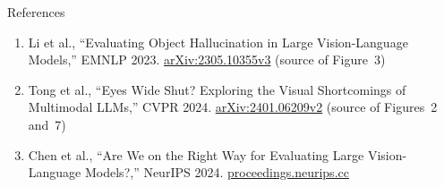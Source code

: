 \begin{frame}[allowframebreaks]{References}
\begin{enumerate}
    \item Li et al., ``Evaluating Object Hallucination in Large Vision-Language Models,'' EMNLP 2023. \href{https://arxiv.org/abs/2305.10355v3}{arXiv:2305.10355v3} (source of Figure~3)
    \item Tong et al., ``Eyes Wide Shut? Exploring the Visual Shortcomings of Multimodal LLMs,'' CVPR 2024. \href{https://arxiv.org/abs/2401.06209v2}{arXiv:2401.06209v2} (source of Figures~2 and~7)
    \item Chen et al., ``Are We on the Right Way for Evaluating Large Vision-Language Models?,'' NeurIPS 2024. \href{https://proceedings.neurips.cc/paper_files/paper/2024/hash/2f8ee6a3d766b426d2618e555b5aeb39-Abstract-Conference.html}{proceedings.neurips.cc}
  \end{enumerate}
\end{frame}
